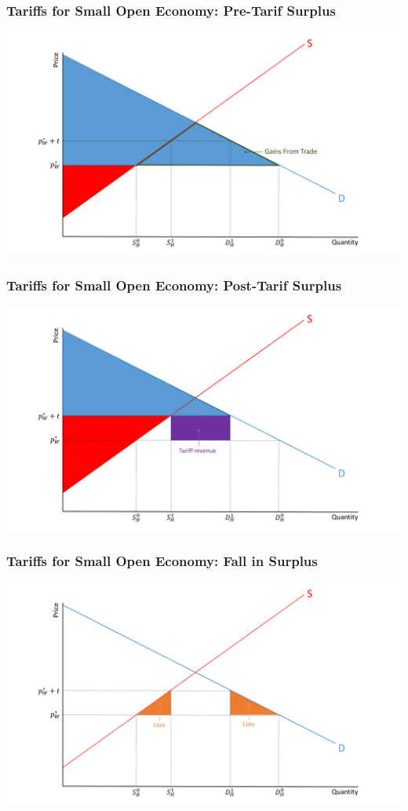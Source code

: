 \documentclass{beamer}
\begin{document}
\begin{frame}
	\frametitle{Tariffs for Small Open Economy: Pre-Tarif Surplus}
	\includegraphics[scale=0.3]{SL_7.pdf}
\end{frame}

\begin{frame}
	\frametitle{Tariffs for Small Open Economy: Post-Tarif Surplus}
	
	\includegraphics[scale=0.3]{SL_8.pdf}
	
\end{frame}

\begin{frame}
	\frametitle{Tariffs for Small Open Economy: Fall in Surplus}
	
		\includegraphics[scale=0.3]{SL_9.pdf}
\end{frame}
\end{document}
